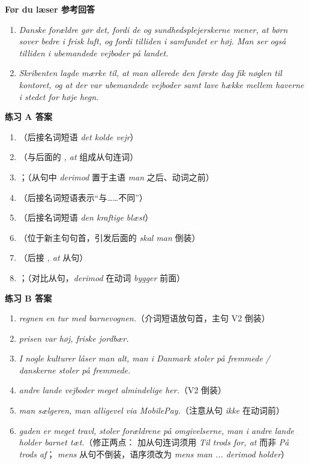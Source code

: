 \begin{answerbox}
\textbf{Før du læser 参考回答}
\begin{enumerate}
  \item \textit{Danske forældre gør det, fordi de og sundhedsplejerskerne mener, at børn sover bedre i frisk luft, og fordi tilliden i samfundet er høj. Man ser også tilliden i ubemandede vejboder på landet.}
  \item \textit{Skribenten lagde mærke til, at man allerede den første dag fik nøglen til kontoret, og at der var ubemandede vejboder samt lave hække mellem haverne i stedet for høje hegn.}
\end{enumerate}

\textbf{练习 A 答案}
\begin{enumerate}
  \item {}（后接名词短语 \textit{det kolde vejr}）
  \item {}（与后面的 \textit{, at} 组成从句连词）
  \item {}；（从句中 \textit{derimod} 置于主语 \textit{man} 之后、动词之前）
  \item {}（后接名词短语表示“与……不同”）
  \item {}（后接名词短语 \textit{den kraftige blæst}）
  \item {}（位于新主句句首，引发后面的 \textit{skal man} 倒装）
  \item {}（后接 \textit{, at} 从句）
  \item {}；（对比从句，\textit{derimod} 在动词 \textit{bygger} 前面）
\end{enumerate}

\textbf{练习 B 答案}
\begin{enumerate}
  \item \textit{ regnen  en tur med barnevognen.}（介词短语放句首，主句 V2 倒装）
  \item \textit{ prisen var høj,  friske jordbær.}
  \item \textit{I nogle kulturer låser man alt,  man i Danmark  stoler på fremmede /  danskerne  stoler på fremmede.}
  \item \textit{ andre lande  vejboder meget almindelige her.}（V2 倒装）
  \item \textit{ man  sælgeren,  man alligevel via MobilePay.}（注意从句 \textit{ikke} 在动词前）
  \item \textit{ gaden er meget travl, stoler forældrene på omgivelserne,  man i andre lande  holder barnet tæt.}（修正两点： 加从句连词须用 \textit{Til trods for, at} 而非 \textit{På trods af}； \textit{mens} 从句不倒装，语序须改为 \textit{mens man ... derimod holder}）
\end{enumerate}


\end{answerbox}
